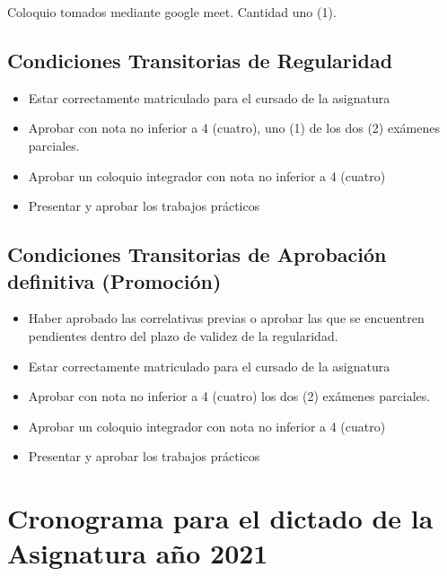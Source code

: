 Coloquio  tomados mediante google meet. Cantidad uno (1).

\subsection*{Condiciones Transitorias de Regularidad}

\begin{itemize}
\item Estar correctamente matriculado para el cursado de la asignatura
\item Aprobar con nota no inferior a 4 (cuatro), uno (1) de los dos
  (2) exámenes parciales.
\item Aprobar un coloquio integrador con nota no inferior a 4 (cuatro)
\item Presentar y aprobar los trabajos prácticos
\end{itemize}

\subsection*{Condiciones Transitorias de Aprobación definitiva (Promoción) }


\begin{itemize}
\item Haber aprobado las correlativas previas o aprobar las que se encuentren pendientes dentro del plazo de validez de la regularidad.

\item  Estar correctamente matriculado para el cursado de la
  asignatura
\item Aprobar con nota no inferior a 4 (cuatro) los dos (2) exámenes
  parciales.
\item Aprobar un coloquio integrador con nota no inferior a 4 (cuatro)
\item Presentar y aprobar los trabajos prácticos
\end{itemize}



\section*{Cronograma para el dictado de la Asignatura a\~no 2021}
\label{sec:00.cronograma}

